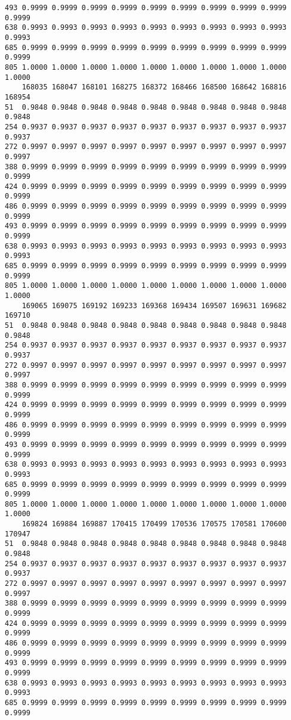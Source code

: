 \documentclass[
]{report}
\begin{document}
\begin{verbatim}
493 0.9999 0.9999 0.9999 0.9999 0.9999 0.9999 0.9999 0.9999 0.9999 0.9999
638 0.9993 0.9993 0.9993 0.9993 0.9993 0.9993 0.9993 0.9993 0.9993 0.9993
685 0.9999 0.9999 0.9999 0.9999 0.9999 0.9999 0.9999 0.9999 0.9999 0.9999
805 1.0000 1.0000 1.0000 1.0000 1.0000 1.0000 1.0000 1.0000 1.0000 1.0000
    168035 168047 168101 168275 168372 168466 168500 168642 168816 168954
51  0.9848 0.9848 0.9848 0.9848 0.9848 0.9848 0.9848 0.9848 0.9848 0.9848
254 0.9937 0.9937 0.9937 0.9937 0.9937 0.9937 0.9937 0.9937 0.9937 0.9937
272 0.9997 0.9997 0.9997 0.9997 0.9997 0.9997 0.9997 0.9997 0.9997 0.9997
388 0.9999 0.9999 0.9999 0.9999 0.9999 0.9999 0.9999 0.9999 0.9999 0.9999
424 0.9999 0.9999 0.9999 0.9999 0.9999 0.9999 0.9999 0.9999 0.9999 0.9999
486 0.9999 0.9999 0.9999 0.9999 0.9999 0.9999 0.9999 0.9999 0.9999 0.9999
493 0.9999 0.9999 0.9999 0.9999 0.9999 0.9999 0.9999 0.9999 0.9999 0.9999
638 0.9993 0.9993 0.9993 0.9993 0.9993 0.9993 0.9993 0.9993 0.9993 0.9993
685 0.9999 0.9999 0.9999 0.9999 0.9999 0.9999 0.9999 0.9999 0.9999 0.9999
805 1.0000 1.0000 1.0000 1.0000 1.0000 1.0000 1.0000 1.0000 1.0000 1.0000
    169065 169075 169192 169233 169368 169434 169507 169631 169682 169710
51  0.9848 0.9848 0.9848 0.9848 0.9848 0.9848 0.9848 0.9848 0.9848 0.9848
254 0.9937 0.9937 0.9937 0.9937 0.9937 0.9937 0.9937 0.9937 0.9937 0.9937
272 0.9997 0.9997 0.9997 0.9997 0.9997 0.9997 0.9997 0.9997 0.9997 0.9997
388 0.9999 0.9999 0.9999 0.9999 0.9999 0.9999 0.9999 0.9999 0.9999 0.9999
424 0.9999 0.9999 0.9999 0.9999 0.9999 0.9999 0.9999 0.9999 0.9999 0.9999
486 0.9999 0.9999 0.9999 0.9999 0.9999 0.9999 0.9999 0.9999 0.9999 0.9999
493 0.9999 0.9999 0.9999 0.9999 0.9999 0.9999 0.9999 0.9999 0.9999 0.9999
638 0.9993 0.9993 0.9993 0.9993 0.9993 0.9993 0.9993 0.9993 0.9993 0.9993
685 0.9999 0.9999 0.9999 0.9999 0.9999 0.9999 0.9999 0.9999 0.9999 0.9999
805 1.0000 1.0000 1.0000 1.0000 1.0000 1.0000 1.0000 1.0000 1.0000 1.0000
    169824 169884 169887 170415 170499 170536 170575 170581 170600 170947
51  0.9848 0.9848 0.9848 0.9848 0.9848 0.9848 0.9848 0.9848 0.9848 0.9848
254 0.9937 0.9937 0.9937 0.9937 0.9937 0.9937 0.9937 0.9937 0.9937 0.9937
272 0.9997 0.9997 0.9997 0.9997 0.9997 0.9997 0.9997 0.9997 0.9997 0.9997
388 0.9999 0.9999 0.9999 0.9999 0.9999 0.9999 0.9999 0.9999 0.9999 0.9999
424 0.9999 0.9999 0.9999 0.9999 0.9999 0.9999 0.9999 0.9999 0.9999 0.9999
486 0.9999 0.9999 0.9999 0.9999 0.9999 0.9999 0.9999 0.9999 0.9999 0.9999
493 0.9999 0.9999 0.9999 0.9999 0.9999 0.9999 0.9999 0.9999 0.9999 0.9999
638 0.9993 0.9993 0.9993 0.9993 0.9993 0.9993 0.9993 0.9993 0.9993 0.9993
685 0.9999 0.9999 0.9999 0.9999 0.9999 0.9999 0.9999 0.9999 0.9999 0.9999

\end{verbatim}
\end{document}
